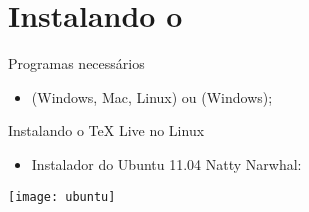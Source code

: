 
\section{Instalando o \LaTex}

\begin{frame}{Programas necessários}
\begin{itemize}
\item {} (Windows, Mac, Linux) ou  (Windows);
\end{itemize}
\end{frame}

\begin{frame}{Instalando o \TeX{} Live no Linux}
\begin{itemize}
\item Instalador do Ubuntu 11.04 Natty Narwhal:
\end{itemize}


\centering\texttt{[image: ubuntu]}

\end{frame}


